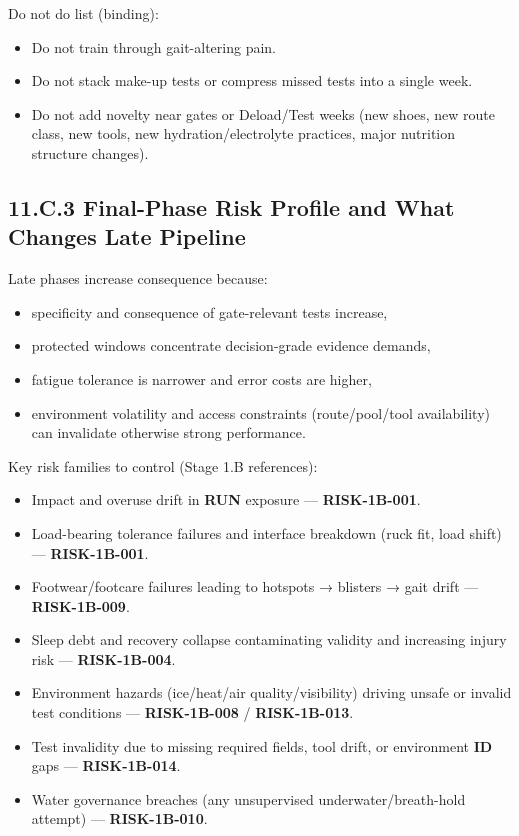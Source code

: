 \documentclass[10pt]{article}
\begin{document}
Do not do list (binding):

\begin{itemize}
\item Do not train through gait-altering pain.
\item Do not stack make-up tests or compress missed tests into a single week.
\item Do not add novelty near gates or Deload/Test weeks (new shoes, new route class, new tools, new hydration/electrolyte practices, major nutrition structure changes).
\end{itemize}

\newpage

\subsection*{11.C.3 Final-Phase Risk Profile and What Changes Late Pipeline}
{}

Late phases increase consequence because:

\begin{itemize}
\item specificity and consequence of gate-relevant tests increase,
\item protected windows concentrate decision-grade evidence demands,
\item fatigue tolerance is narrower and error costs are higher,
\item environment volatility and access constraints (route/pool/tool availability) can invalidate otherwise strong performance.
\end{itemize}

Key risk families to control (Stage 1.B references):

\begin{itemize}
\item Impact and overuse drift in \textbf{RUN} exposure — \textbf{RISK-1B-001}.
\item Load-bearing tolerance failures and interface breakdown (ruck fit, load shift) — \textbf{RISK-1B-001}.
\item Footwear/footcare failures leading to hotspots → blisters → gait drift — \textbf{RISK-1B-009}.
\item Sleep debt and recovery collapse contaminating validity and increasing injury risk — \textbf{RISK-1B-004}.
\item Environment hazards (ice/heat/air quality/visibility) driving unsafe or invalid test conditions — \textbf{RISK-1B-008} / \textbf{RISK-1B-013}.
\item Test invalidity due to missing required fields, tool drift, or environment \textbf{ID} gaps — \textbf{RISK-1B-014}.
\item Water governance breaches (any unsupervised underwater/breath-hold attempt) — \textbf{RISK-1B-010}.
\end{itemize}
\end{document}

